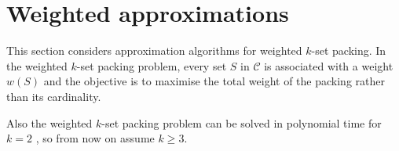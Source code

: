 
\section{Weighted approximations}\label{sec:Weighted}

This section considers approximation algorithms for weighted $k$-set packing. In the weighted $k$-set packing problem, every set $S$ in $\mathcal{C}$ is associated with a weight $w(S)$ and the objective is to maximise the total weight of the packing rather than its cardinality. %

Also the weighted $k$-set packing problem can be solved in polynomial time for $k=2$ \cite{Minty2}, so from now on assume $k \geq 3$.

%

